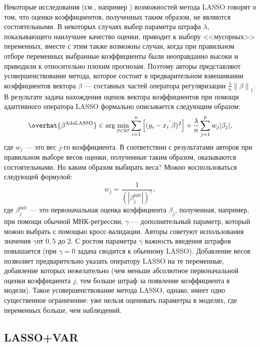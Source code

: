 Некоторые исследования (см., например \cite{zou2006adaptive})
возможностей метода LASSO говорят о том, что оценки коэффициентов, полученных таким образом, не являются состоятельными. В некоторых случаях выбор параметра штрафа $\lambda$, показывающего наилучшее качество оценки, приводит к выбору <<мусорных>> переменных, вместе с этим также возможны случаи, когда при правильном отборе переменных выбранные коэффициенты были неоправданно высоки и приводили к относительно плохим прогнозам. Поэтому авторы представляют усовершенствование метода, которое состоит в предварительном взвешивании коэффициентов вектора $\beta$ --- составных частей оператора регуляризации $\frac{\lambda}{n} \left\lVert \beta \right\rVert_1$. В результате задача нахождения оценок вектора коэффициентов при помощи адаптивного оператора LASSO формально описывается следующим образом:
\begin{equation}
\overhat{\beta^{\text{AdaLASSO}}} \in \arg \min_{\beta \in
\mathbb{R}^p} \sum_{i=1}^n \left[ (y_i - {x_i}^{'} \beta)^2 \right] +  \frac{\lambda}{n} \sum_{j=1}^p w_j |\beta_j|,
\end{equation}
где $w_j$ --- это вес $j$-го коэффициента. В соответствии с результатами авторов при правильном выборе весов оценки, полученные таким образом, оказываются состоятельными. Но каким образом выбирать веса? Можно воспользоваться следующей формулой:
\begin{equation}
w_j = \frac{1}{(|\beta_j^{\text{init}}|)^\gamma},
\end{equation}
где $\beta_j^{\text{init}}$ --- это первоначальная оценка коэффициента $\beta_j$, полученная, например, при помощи обычной МНК-регрессии,
$\gamma$ --- дополнительный параметр, который можно выбрать с помощью кросс-валидации. Авторы советуют использования значения $\gamma $от $0,5$ до $2$. С ростом параметра $\gamma$ важность введения штрафов повышается (при $\gamma = 0$ задача сводится к обычному LASSO). Добавление весов позволяет предварительно указать оператору LASSO на те переменные, добавление которых нежелательно (чем меньше  абсолютное первоначальной оценки коэффициента $j$, тем больше  штраф за появление коэффициента в модели). Такое усовершенствование метода LASSO, однако, имеет одно существенное ограничение: уже нельзя оценивать параметры в моделях, где переменных больше, чем наблюдений.


\subsection{LASSO+VAR}

